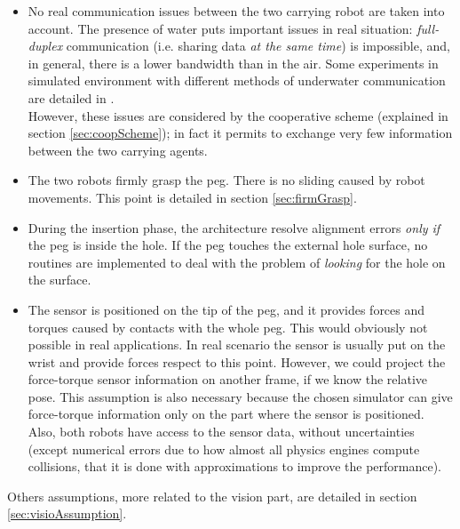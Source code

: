 \begin{itemize}
	\item No real communication issues between the two carrying robot are taken into account. The presence of water puts important issues in real situation: \textit{full-duplex} communication (i.e. sharing data \textit{at the same time}) is impossible, and, in general, there is a lower bandwidth than in the air. Some experiments in simulated environment with different methods of underwater communication are detailed in \cite{IntroMaris2}.\\
	However, these issues are considered by the cooperative scheme (explained in section \ref{sec:coopScheme}); in fact it permits to exchange very few information between the two carrying agents.
	
	\item The two robots firmly grasp the peg. There is no sliding caused by robot movements. This point is detailed in section \ref{sec:firmGrasp}.
	
	\item During the insertion phase, the architecture resolve alignment errors \textit{only if} the peg is inside the hole. If the peg touches the external hole surface, no routines are implemented to deal with the problem of \textit{looking} for the hole on the surface.
	
	\item The sensor is positioned on the tip of the peg, and it provides forces and torques caused by contacts with the whole peg. This would obviously not possible in real applications. In real scenario the sensor is usually put on the wrist and provide forces respect to this point. However, we could project the force-torque sensor information on another frame, if we know the relative pose. This assumption is also necessary because the chosen simulator can give force-torque information only on the part where the sensor is positioned.\\
	Also, both robots have access to the sensor data, without uncertainties (except numerical errors due to how almost all physics engines compute collisions, that it is done with approximations to improve the performance).
	
\end{itemize}

\noindent Others assumptions, more related to the vision part, are detailed in section \ref{sec:visioAssumption}.

